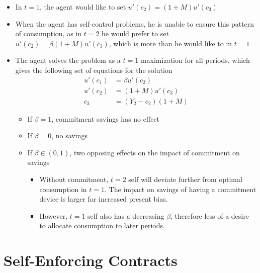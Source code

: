 \documentclass[a4paper]{article}
\begin{document}
\begin{itemize}
    \item In $t=1$, the agent would like to set $u'(c_2)=(1+M)u'(c_3)$
    \item When the agent has self-control problems, he is unable to ensure this pattern of consumption, as in $t=2$ he would prefer to set $u'(c_2)=\beta(1+M)u'(c_3)$, which is more than he would like to in $t=1$
    \item The agent solves the problem as a $t=1$ maximization for all periods, which gives the following set of equations for the solution
    \begin{align*}
        u'(c_1)&=\beta u'(c_2) \\
        u'(c_2)&=(1+M) u'(c_3) \\
        c_3&=(Y_2-c_2)(1+M)
    \end{align*}
    \begin{itemize}
        \item If $\beta=1$, commitment savings has no effect
        \item If $\beta=0$, no savings
        \item If $\beta\in(0,1)$, two opposing effects on the impact of commitment on savings
        \begin{itemize}
            \item Without commitment, $t=2$ self will deviate further from optimal consumption in $t=1$. The impact on savings of having a commitment device is larger for increased present bias.
            \item However, $t=1$ self also has a decreasing $\beta$, therefore less of a desire to allocate consumption to later periods.
        \end{itemize}
    \end{itemize}
\end{itemize}

\section{Self-Enforcing Contracts}
\end{document}
